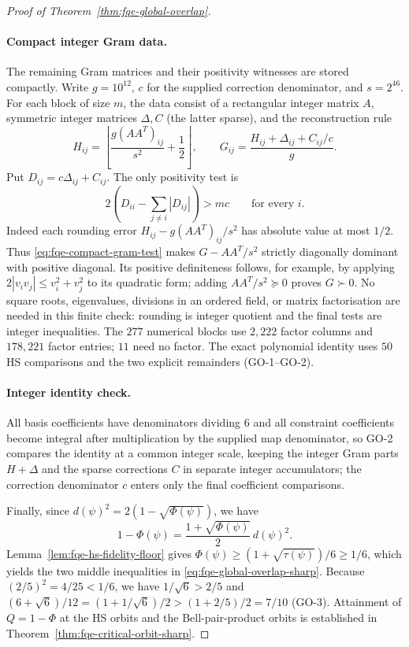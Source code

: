 \begin{proof}[Proof of Theorem~\ref{thm:fqe-global-overlap}]
\paragraph{Compact integer Gram data.}
The remaining Gram matrices and their positivity witnesses are stored compactly.
Write $g=10^{12}$, $c$ for the supplied correction denominator, and $s=2^{46}$.
For each block of size $m$, the data consist of a rectangular integer matrix $A$, symmetric integer matrices
$\Delta,C$ (the latter sparse), and the reconstruction rule
\[
 H_{ij}=\left\lfloor\frac{g(AA^T)_{ij}}{s^2}+\frac12\right\rfloor,
 \qquad G_{ij}=\frac{H_{ij}+\Delta_{ij}+C_{ij}/c}{g}.
\]
Put $D_{ij}=c\Delta_{ij}+C_{ij}$. The only positivity test is
\begin{equation}\label{eq:fqe-compact-gram-test}
 2\left(D_{ii}-\sum_{j\ne i}|D_{ij}|\right)>mc\qquad\text{for every }i.
\end{equation}
Indeed each rounding error $H_{ij}-g(AA^T)_{ij}/s^2$ has absolute value at most $1/2$.
Thus \eqref{eq:fqe-compact-gram-test} makes $G-AA^T/s^2$ strictly diagonally dominant with positive diagonal.
Its positive definiteness follows, for example, by applying $2|v_iv_j|\le v_i^2+v_j^2$ to its quadratic form;
adding $AA^T/s^2\succeq0$ proves $G\succ0$.
No square roots, eigenvalues, divisions in an ordered field, or matrix factorisation are needed in this finite check:
rounding is integer quotient and the final tests are integer inequalities.
The $277$ numerical blocks use $2{,}222$ factor columns and $178{,}221$ factor entries; $11$ need no factor.
The exact polynomial identity uses $50$ HS comparisons and the two explicit remainders (GO-1--GO-2).

\paragraph{Integer identity check.}
All basis coefficients have denominators dividing $6$ and all constraint coefficients become integral after
multiplication by the supplied map denominator, so GO-2 compares the identity at a common integer scale, keeping the
integer Gram parts $H+\Delta$ and the sparse corrections $C$ in separate integer accumulators; the correction
denominator $c$ enters only the final coefficient comparisons.

Finally, since $d(\psi)^2=2(1-\sqrt{\Phi(\psi)})$, we have
\[
 1-\Phi(\psi)=\frac{1+\sqrt{\Phi(\psi)}}{2}\,d(\psi)^2.
\]
Lemma~\ref{lem:fqe-hs-fidelity-floor} gives
$\Phi(\psi)\ge(1+\sqrt{\tau(\psi)})/6\ge1/6$, which yields the two middle
inequalities in \eqref{eq:fqe-global-overlap-sharp}. Because
$(2/5)^2=4/25<1/6$, we have $1/\sqrt6>2/5$ and
$(6+\sqrt6)/12=(1+1/\sqrt6)/2>(1+2/5)/2=7/10$ (GO-3). Attainment of
$Q=1-\Phi$ at the HS orbits and the Bell-pair-product orbits is established in
Theorem~\ref{thm:fqe-critical-orbit-sharp}.
\end{proof}

